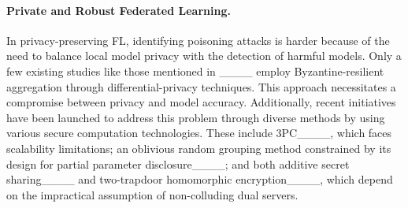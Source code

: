 


\paragraph{Private and Robust Federated Learning.}

In privacy-preserving FL, identifying poisoning attacks is harder because of the need to balance local model privacy with the detection of harmful models.
Only a few existing studies like those mentioned in ____ employ Byzantine-resilient aggregation through differential-privacy techniques. This approach necessitates a compromise between privacy and model accuracy.
Additionally, recent initiatives have been launched to address this problem through diverse methods by using various secure computation technologies. These include 3PC____, which faces scalability limitations; an oblivious random grouping method constrained by its design for partial parameter disclosure____; and both additive secret sharing____ and two-trapdoor homomorphic encryption____, which depend on the impractical assumption of non-colluding dual servers.



